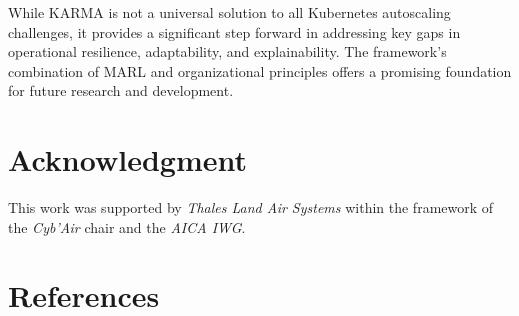 \documentclass[conference]{IEEEtran}
\begin{document}
While KARMA is not a universal solution to all Kubernetes autoscaling challenges, it provides a significant step forward in addressing key gaps in operational resilience, adaptability, and explainability. The framework's combination of MARL and organizational principles offers a promising foundation for future research and development.

\section*{Acknowledgment}
    This work was supported by \emph{Thales Land Air Systems} within the framework of the \emph{Cyb'Air} chair and the \emph{AICA IWG}.

\section*{References}

\nocite{alDhuraibi2017elasticDocker}

% 



\end{document}
